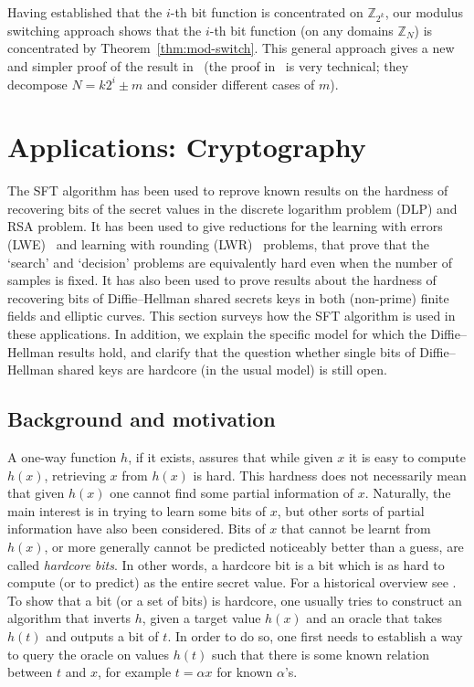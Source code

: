 \documentclass[11pt]{article}
\theoremstyle{definition}
\newcommand{\Z}{\mathbb{Z}}
\begin{document}
Having established that the $i$-th bit function is concentrated on $\Z_{2^k}$, our modulus switching approach shows that the $i$-th bit function (on any domains $\Z_N$) is concentrated by Theorem~\ref{thm:mod-switch}. This general approach gives a new and simpler proof of the result in~\cite{MR} (the proof in~\cite{MR} is very technical; they decompose $N = k 2^i \pm m$ and consider different cases of $m$).


\section{Applications: Cryptography}
\label{sec_applications}

The SFT algorithm has been used to reprove known results on the hardness of recovering bits of the secret values in the discrete logarithm problem (DLP) and RSA problem. It has been used to give reductions for the learning with errors (LWE)~\cite{LWE} and learning with rounding (LWR)~\cite{LWR} problems, that prove that the `search' and `decision' problems are equivalently hard even when the number of samples is fixed. It has also been used to prove results about the hardness of recovering bits of Diffie--Hellman shared secrets keys in both (non-prime) finite fields and elliptic curves. This section surveys how the SFT algorithm is used in these applications. In addition, we explain the specific model for which the Diffie--Hellman results hold, and clarify that the question whether single bits of Diffie--Hellman shared keys are hardcore (in the usual model) is still open.


\subsection{Background and motivation}\label{sec:HNP}

A one-way function $h$, if it exists, assures that while given $x$ it is easy to compute $h(x)$, retrieving $x$ from $h(x)$ is hard. This hardness does not necessarily mean that given $h(x)$ one cannot find some partial information of $x$. Naturally, the main interest is in trying to learn some bits of $x$, but other sorts of partial information have also been considered. Bits of $x$ that cannot be learnt from $h(x)$, or more generally cannot be predicted noticeably better than a guess, are called \emph{hardcore bits}. In other words, a hardcore bit is a bit which is as hard to compute (or to predict) as the entire secret value.
For a historical overview see \cite{HardCoreSurvey}.
To show that a bit (or a set of bits) is hardcore, one usually tries to construct an algorithm that inverts $h$, given a target value $h(x)$ and an oracle that takes $h(t)$ and outputs a bit of $t$. In order to do so, one first needs to establish a way to query the oracle on values $h(t)$ such that there is some known relation between $t$ and $x$, for example $t = \alpha x$ for known $\alpha$'s.
\end{document}
